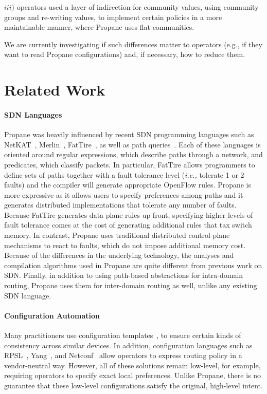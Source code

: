 \documentclass{sig-alternate-10pt}
\newcommand{\sysname}{{\small \sf Propane}\xspace}
\begin{document}
$iii)$ operators used a layer of indirection for community values, using community groups and re-writing values, to implement certain policies in a more maintainable manner, where \sysname uses flat communities.


We are currently investigating if such differences matter to operators (e.g., if they want to read \sysname configurations) and, if necessary, how to reduce them.




%
%
%
%

\section{Related Work}
\label{sec:related}

\paragraph*{SDN Languages}
\sysname{} was heavily influenced by recent SDN programming
languages such as NetKAT~\cite{netkat}, Merlin~\cite{foster:merlin}, FatTire~\cite{fattire}, 
as well as path queries~\cite{queries}.
Each of these languages is oriented around regular expressions, which
describe paths through a network, and predicates, which classify packets.
In particular, FatTire allows programmers to define sets of paths together
with a fault tolerance level (\emph{i.e.,} tolerate 1 or 2 faults)
and the compiler will generate appropriate OpenFlow rules.
\sysname is more expressive as it allows users to specify preferences among
paths and it generates distributed implementations that tolerate any number of faults. 
Because FatTire generates data plane rules up front, 
specifying higher levels of fault tolerance comes
at the cost of generating additional rules that tax switch memory.  
In contrast, \sysname uses traditional distributed
control plane mechanisms to react to faults, which do not impose additional memory cost.
Because of the differences in the underlying technology, the analyses
and compilation algorithms used in \sysname are quite different from
previous work on SDN. 
Finally, in addition to using path-based abstractions
for intra-domain routing, \sysname uses them for inter-domain routing as
well, unlike any existing SDN language.

\paragraph*{Configuration Automation}
Many practitioners use configuration templates~\cite{hatch,thwack}, to ensure certain kinds of consistency across similar devices. In addition, configuration languages such as RPSL~\cite{RFC2622}, Yang~\cite{RFC6020}, and Netconf~\cite{RFC6241} allow operators to express routing policy in a vendor-neutral way. 
However, all of these solutions remain low-level, for example, requiring operators to specify exact local preferences. Unlike \sysname, there is no guarantee that these low-level configurations satisfy the original, high-level intent.
\end{document}
